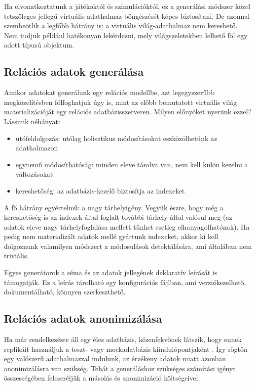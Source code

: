 \documentclass[
    parspace,
    noindent,
    nohyp,
]{elteiktdk}[2023/04/10]
\newcommand{\todoref}[1]{\todo[inline, noinlinepar, color=red, textcolor=white, inlinewidth=0.6cm, caption={#1}]{\large \textbf{×}}}
\begin{document}
Ha elvonatkoztatunk a játékoktól és szimulációktól,
ez a generálási módszer közel tetszőleges jellegű virtuális adathalmaz böngészését képes biztosítani.
De azonnal szembeötlik a legfőbb hátrány is: a virtuális világ-adathalmaz nem kereshető.
Nem tudjuk például hatékonyan lekérdezni, mely világszeletekben lelhető föl egy adott típusú objektum.

\subsection{Relációs adatok generálása}

Amikor adatokat generálunk egy relációs modellbe, azt legegyszerűbb megközelítésben fölfoghatjuk úgy is,
mint az előbb bemutatott virtuális világ materializációját egy relációs adatbázisszerveren.
Milyen előnyöket nyerünk ezzel? Lássunk néhányat:

\begin{itemize}
    \item utófeldolgozás: utólag holisztikus módosításokat eszközölhetünk az adathalmazon
    \item egynemű módosíthatóság: minden eleve tárolva van, nem kell külön kezelni a változásokat
    \item kereshetőség: az adatbázis-kezelő biztosítja az indexeket
\end{itemize}

A fő hátrány egyértelmű: a nagy tárhelyigény.
Vegyük észre, hogy még a kereshetőség is az indexek által foglalt további tárhely által valósul meg
(az adatok eleve nagy tárhelyfoglalása mellett tűnhet esetleg elhanyagolhatónak).
Ha pedig nem materializált adatok mellé gyártunk indexeket,
akkor ki kell dolgoznunk valamilyen módszert a módosulások detektálására, ami általában nem triviális.

Egyes generátorok a séma és az adatok jellegének deklaratív leírását is támogatják. Ez a leírás tárolható egy konfigurációs fájlban, ami verziókezelhető, dokumentálható, könnyen szerkeszthető.
\todoref{+CITE: DB deklaratív adatgenerátorok}

\subsection{Relációs adatok anonimizálása}

Ha már rendelkezésre áll egy éles adatbázis, kézenfekvőnek látszik,
hogy ennek replikáit használjuk a teszt- vagy mockadatbázis kiindulópontjaként \todoref{+CITE: DB anonimizálók}.
Így rögtön egy valószerű adathalmazzal indulunk,
az érzékeny adatok miatt azonban anonimizálásra van szükség.
Tehát a generáláshoz szükséges számítási igényt összességében
felcseréljük a másolás és anonimizáció költségeivel.
\end{document}
